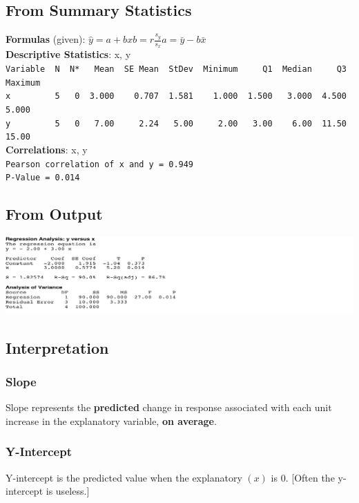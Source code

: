 \documentclass[9pt, oneside]{extarticle}   	%
\begin{document}
\subsection{From Summary Statistics} %
\label{sub:from_summary_statistics}
{\bf Formulas} (given): $\hat{y} = a + bx$\quad\quad$b = r\frac{s_y}{s_x}$\quad\quad$a=\bar{y}-b\bar{x}$\\[.2in]
{\bf Descriptive Statistics}: x, y\\
\verb|Variable  N  N*   Mean  SE Mean  StDev  Minimum     Q1  Median     Q3  Maximum|\\
\verb|x         5   0  3.000    0.707  1.581    1.000  1.500   3.000  4.500    5.000|\\
\verb|y         5   0   7.00     2.24   5.00     2.00   3.00    6.00  11.50    15.00|\\[.1in]
{\bf Correlations}: x, y \\
\verb|Pearson correlation of x and y = 0.949|\\
\verb|P-Value = 0.014|\\[.5in]


\subsection{From Output} %
\label{sub:from_output}
\includegraphics[width=1\textwidth]{img/5_RegOut}\\[.25in]

\subsection{Interpretation} %
\label{sub:interpretation}
\subsubsection{Slope}
Slope represents the  \textbf{predicted} change in response associated with each unit increase in the explanatory variable, \textbf{on average}.\\[.25in]
\subsubsection{Y-Intercept}
Y-intercept is the predicted value when the explanatory $(x)$ is 0. [Often the y-intercept is useless.]
\end{document}
